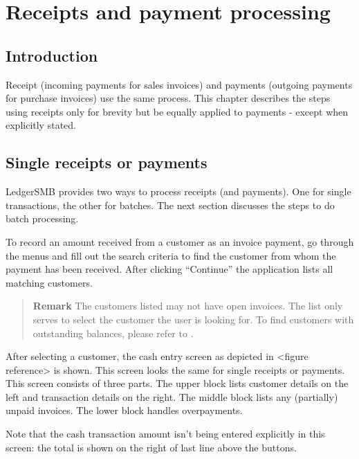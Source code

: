 \chapter{Receipts and payment processing}
\label{cha-workflows-payment-processing}

\section{Introduction}
\label{sec-workflows-payment-processing-introduction}

Receipt (incoming payments for sales invoices) and payments (outgoing payments
for purchase invoices) use the same process. This chapter describes the steps
using receipts only for brevity but be equally applied to payments - except
when explicitly stated.

\section{Single receipts or payments}
\label{sec-workflows-payment-processing-single-payments}

LedgerSMB provides two ways to process receipts (and payments). One for single transactions,
the other for batches. The next section discusses the steps to do batch processing.

To record an amount received from a \gls{customer} as an invoice payment, go through the menus
 and fill out the search criteria to find the customer from whom
the payment has been received. After clicking ``Continue'' the application lists all matching
customers.

\begin{quotation}
\textbf{Remark} The customers listed may not have open invoices. The list only serves to select
the \gls{customer} the user is looking for. To find customers with outstanding balances, please refer to
.
\end{quotation}

After selecting a \gls{customer}, the cash entry screen as depicted in <figure reference> is shown. This
screen looks the same for single receipts or payments. This screen consists of three parts. The upper
block lists customer details on the left and transaction details on the right. The middle block lists
any (partially) unpaid invoices. The lower block handles overpayments.

Note that the cash transaction amount isn't being entered explicitly in this screen: the total
is shown on the right of last line above the buttons.

